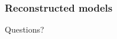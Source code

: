 \documentclass{beamer}
\begin{document}
\begin{frame}
\frametitle{Reconstructed models}


\end{frame}


\begin{frame}
\centering
Questions? \\
\end{frame}



%         
%         

\end{document}
